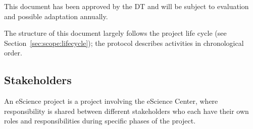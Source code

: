\documentclass[11pt]{article}
\begin{document}
This document has been approved by the DT and will be subject to evaluation and possible adaptation annually.

The structure of this document largely follows the project life cycle (see Section~\ref{sec:scope:lifecycle}); the
protocol describes activities in chronological order.

\subsection{Stakeholders}
An eScience project is a project involving the eScience Center, where responsibility is shared between different
stakeholders who each have their own roles and responsibilities during specific phases of the project.


\end{document}
